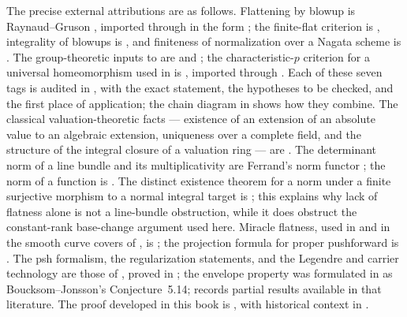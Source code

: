 The precise external attributions are as follows.  Flattening by blowup is
Raynaud--Gruson \cite{RaynaudGruson1971}, imported through
 in the form
\cite[\href{https://stacks.math.columbia.edu/tag/0815}{Tag 0815}]
{stacks-project}; the finite-flat criterion is
\cite[\href{https://stacks.math.columbia.edu/tag/02K9}{Tag 02K9}]
{stacks-project}, integrality of blowups is
\cite[\href{https://stacks.math.columbia.edu/tag/01OF}{Tag 01OF}]
{stacks-project}, and finiteness of normalization over a Nagata scheme is
\cite[\href{https://stacks.math.columbia.edu/tag/035S}{Tag 035S}]
{stacks-project}.  The group-theoretic inputs to
 are
\cite[\href{https://stacks.math.columbia.edu/tag/0BRI}{Tag 0BRI}]
{stacks-project} and
\cite[\href{https://stacks.math.columbia.edu/tag/0BRJ}{Tag 0BRJ}]
{stacks-project}; the characteristic-$p$ criterion for a universal
homeomorphism used in  is
\cite[\href{https://stacks.math.columbia.edu/tag/0CNF}{Tag 0CNF}]
{stacks-project}, imported through
.  Each of these seven
tags is audited in , with the exact statement, the
hypotheses to be checked, and the first place of application; the chain
diagram in  shows how they combine.  The
classical valuation-theoretic facts --- existence of an extension of an
absolute value to an algebraic extension, uniqueness over a complete field,
and the structure of the integral closure of a valuation ring --- are
\cite[Chapter~VI]{ZariskiSamuelII}.  The determinant norm of a line bundle
and its multiplicativity are Ferrand's norm functor
\cite[Proposition~3.3]{FerrandNorm}; the
norm of a function is
\cite[\href{https://stacks.math.columbia.edu/tag/0BD2}{Tag 0BD2}]
{stacks-project}.  The distinct existence theorem for a norm under a
finite surjective morphism to a normal integral target is
\cite[\href{https://stacks.math.columbia.edu/tag/0BD3}{Tag 0BD3}]
{stacks-project}; this explains why lack of flatness alone is not a
line-bundle obstruction, while it does obstruct the constant-rank
base-change argument used here.
Miracle flatness, used in  and in the
smooth curve covers of , is \cite[Theorem~23.1]{Mat89}; the projection
formula for proper pushforward is \cite[Propositions~1.4 and~2.3]{Ful}.  The
psh formalism, the regularization statements, and the Legendre and carrier
technology are those of \cite{BJ22}, proved in
;
the envelope property was formulated in \cite{BJ22} as Boucksom--Jonsson's
Conjecture~5.14; \cite{BJ22b} records partial results available in that
literature.  The proof developed in this book is
, with historical context in
.

